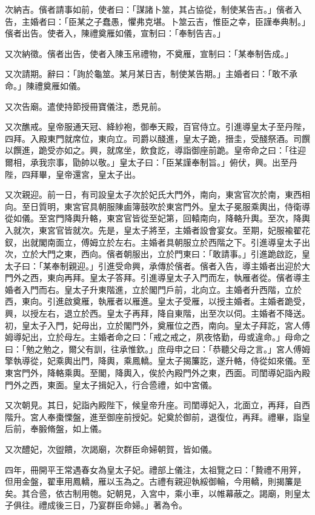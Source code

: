 次納吉。儐者請事如前，使者曰：「謀諸卜筮，其占協從，制使某告吉。」儐者入告，主婚者曰：「臣某之子蠢愚，懼弗克堪。卜筮云吉，惟臣之幸，臣謹奉典制。」儐者出告。使者入，陳禮奠雁如儀，宣制曰：「奉制告吉。」

又次納徵。儐者出告，使者入陳玉帛禮物，不奠雁，宣制曰：「某奉制告成。」

又次請期。辭曰：「詢於龜筮。某月某日吉，制使某告期。」主婚者曰：「敢不承命。」陳禮奠雁如儀。

又次告廟。遣使持節授冊寶儀注，悉見前。

又次醮戒。皇帝服通天冠、絳紗袍，御奉天殿，百官侍立。引進導皇太子至丹陛，四拜。入殿東門就席位，東向立。司爵以醆進，皇太子跪，搢圭，受醆祭酒。司饌以饌進，跪受亦如之。興，就席坐，飲食訖，導詣御座前跪。皇帝命之曰：「往迎爾相，承我宗事，勖帥以敬。」皇太子曰：「臣某謹奉制旨。」俯伏，興。出至丹陛，四拜畢，皇帝還宮，皇太子出。

又次親迎。前一日，有司設皇太子次於妃氏大門外，南向，東宮官次於南，東西相向。至日質明，東宮官具朝服陳鹵簿鼓吹於東宮門外。皇太子冕服乘輿出，侍衛導從如儀。至宮門降輿升輅，東宮官皆從至妃第，回轅南向，降輅升輿。至次，降輿入就次，東宮官皆就次。先是，皇太子將至，主婚者設會宴女。至期，妃服褕翟花釵，出就閣南面立，傅姆立於左右。主婚者具朝服立於西階之下。引進導皇太子出次，立於大門之東，西向。儐者朝服出，立於門東曰：「敢請事。」引進跪啟訖，皇太子曰：「某奉制親迎。」引進受命興，承傳於儐者。儐者入告，導主婚者出迎於大門外之西，東向再拜。皇太子答拜。引進導皇太子入門而左，執雁者從。儐者導主婚者入門而右。皇太子升東階進，立於閣門戶前，北向立。主婚者升西階，立於西，東向。引進啟奠雁，執雁者以雁進。皇太子受雁，以授主婚者。主婚者跪受，興，以授左右，退立於西。皇太子再拜，降自東階，出至次以伺。主婚者不降送。初，皇太子入門，妃母出，立於閣門外，奠雁位之西，南向。皇太子拜訖，宮人傅姆導妃出，立於母左。主婚者命之曰：「戒之戒之，夙夜恪勤，毋或違命。」母命之曰：「勉之勉之，爾父有訓，往承惟欽。」庶母申之曰：「恭聽父母之言。」宮人傅姆擎執導從，妃乘輿出門，降輿，乘鳳轎。皇太子揭簾訖，遂升輅，侍從如來儀。至東宮門外，降輅乘輿。至閣，降輿入，俟於內殿門外之東，西面。司閨導妃詣內殿門外之西，東面。皇太子揖妃入，行合巹禮，如中宮儀。

又次朝見。其日，妃詣內殿陛下，候皇帝升座。司閨導妃入，北面立，再拜，自西階升。宮人奉棗慄盤，進至御座前授妃。妃奠於御前，退復位，再拜。禮畢，詣皇后前，奉腶脩盤，如上儀。

又次醴妃，次盥饋，次謁廟，次群臣命婦朝賀，皆如儀。

四年，冊開平王常遇春女為皇太子妃。禮部上儀注，太祖覽之曰：「贄禮不用笄，但用金盤，翟車用鳳轎，雁以玉為之。古禮有親迎執綏御輪，今用轎，則揭簾是矣。其合巹，依古制用匏。妃朝見，入宮中，乘小車，以帷幕蔽之。謁廟，則皇太子俱往。禮成後三日，乃宴群臣命婦。」著為令。


